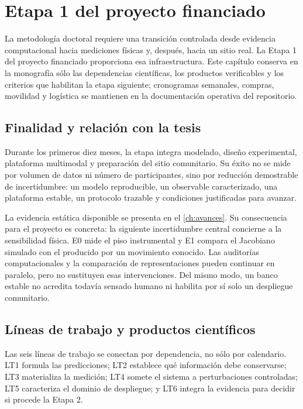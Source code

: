 \chapter{Etapa 1 del proyecto financiado}
\label{ch:stage1}
\label{ch:wbs_stage1}

La metodología doctoral requiere una transición controlada desde evidencia
computacional hacia mediciones físicas y, después, hacia un sitio real. La Etapa 1
del proyecto financiado proporciona esa infraestructura. Este capítulo conserva
en la monografía sólo las dependencias científicas, los productos verificables y
los criterios que habilitan la etapa siguiente; cronogramas semanales, compras,
movilidad y logística se mantienen en la documentación operativa del repositorio.

\section{Finalidad y relación con la tesis}

Durante los primeros diez meses, la etapa integra modelado, diseño experimental,
plataforma multimodal y preparación del sitio comunitario. Su éxito no se mide por
volumen de datos ni número de participantes, sino por reducción demostrable de
incertidumbre: un modelo reproducible, un observable caracterizado, una plataforma
estable, un protocolo trazable y condiciones justificadas para avanzar.

La evidencia estática disponible se presenta en el \cref{ch:avances}. Su consecuencia
para el proyecto es concreta: la siguiente incertidumbre central concierne a la
sensibilidad física. E0 mide el piso instrumental y E1 compara el Jacobiano simulado
con el producido por un movimiento conocido. Las auditorías computacionales y la
comparación de representaciones pueden continuar en paralelo, pero no sustituyen
esas intervenciones. Del mismo modo, un banco estable no acredita todavía sensado
humano ni habilita por sí solo un despliegue comunitario.

\section{Líneas de trabajo y productos científicos}

Las seis líneas de trabajo se conectan por dependencia, no sólo por calendario.
LT1 formula las predicciones; LT2 establece qué información debe conservarse; LT3
materializa la medición; LT4 somete el sistema a perturbaciones controladas; LT5
caracteriza el dominio de despliegue; y LT6 integra la evidencia para decidir si
procede la Etapa 2.

